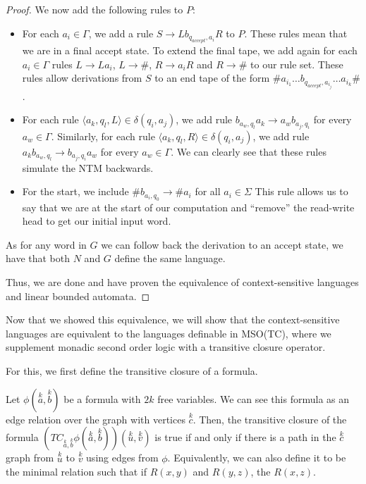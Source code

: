 \begin{proof}
    We now add the following rules to $P$:
    \begin{itemize}
        \setlength\itemsep{0.2em}
        \item For each $a_i \in \Gamma$, we add a rule $S \to Lb_{q_{accept}, a_i}R$ to $P$.
        These rules mean that we are in a final accept state.
        To extend the final tape, we add again for each $a_i \in \Gamma$ rules $L \to La_i$, $L \to \#$, $R \to a_{i}R$ and $R \to \#$ to our rule set.
        These rules allow derivations from $S$ to an end tape of the form $\#a_{i_1}\dots b_{q_{accept}, a_{i_j}}\dots a_{i_k}\#$.
        \item For each rule $\langle a_k, q_l, L \rangle \in \delta(q_i, a_j)$, we add rule $b_{a_w, q_l}a_k \to a_{w}b_{a_j, q_i}$ for every $a_w \in \Gamma$.
        Similarly, for each rule $\langle a_k, q_l, R \rangle \in \delta(q_i, a_j)$, we add rule $a_{k}b_{a_w, q_l} \to b_{a_j, q_i}a_{w}$ for every $a_w \in \Gamma$.
        We can clearly see that these rules simulate the NTM backwards.
        \item For the start, we include $\#b_{a_i, q_0} \to \#a_i$ for all $a_i \in \Sigma$
        This rule allows us to say that we are at the start of our computation and ``remove'' the read-write head to get our initial input word.
    \end{itemize}
    As for any word in $G$ we can follow back the derivation to an accept state, we have that both $N$ and $G$ define the same language.

    Thus, we are done and have proven the equivalence of context-sensitive languages and linear bounded automata.
\end{proof}

Now that we showed this equivalence, we will show that the context-sensitive languages are equivalent to the languages definable in MSO(TC), where we supplement monadic second order logic with a transitive closure operator.

For this, we first define the transitive closure of a formula.

\begin{define}
    Let $\phi\left(\overset{k}{a}, \overset{k}{b}\right)$ be a formula with $2k$ free variables.
    We can see this formula as an edge relation over the graph with vertices $\overset{k}{c}$.
    Then, the transitive closure of the formula $\left(TC_{\overset{k}{a}, \overset{k}{b}}\phi\left(\overset{k}{a}, \overset{k}{b}\right)\right)\left(\overset{k}{u}, \overset{k}{v}\right)$ is true if and only if there is a path in the $\overset{k}{c}$ graph from $\overset{k}{u}$ to $\overset{k}{v}$ using edges from $\phi$.
    Equivalently, we can also define it to be the minimal relation such that if $R(x, y)$ and $R(y, z)$, the $R(x, z)$.
\end{define}

